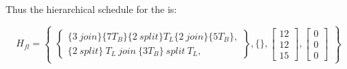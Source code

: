 Thus the hierarchical schedule for the {\feedbackloop} is:

\begin{displaymath}
H_{fl} = \left\{
\begin{array}{c}
\left\{\begin{array}{c}\{3\ join\} \{7T_B\} \{2\ split\} T_L \{2\ join\} \{5T_B\},\\
\{2\ split\}\ T_L \ join\ \{3T_B\}\ split\
T_L,\end{array}\right\}, \{\}, \left[
\begin{array}{c}
12\\12\\15
\end{array}\right], \left[
\begin{array}{c}
0\\0\\0
\end{array}\right] \end{array}\right\}
\end{displaymath}

\begin{comment}
Scheduling {\feedbackloops} requires some extra care, as explained
above.  Once again, steady schedule multiplicities are computed,
but this time, the amount of data buffered between the {\joiner},
$body$, {\splitter} and $loop$ is required in order to perform the
algorithm.

The first step in the algorithm is to execute the {\joiner} as many
times as possible, depending on how much data is available between
the $loop$ and the {\joiner}, up to the number permitted in
executing a steady schedule. Data is transferred between buffers
at known rates, and buffering is adjusted appropriately. Next the
$body$ is executed as much as possible, followed by the {\splitter},
followed by the $loop$.  If, after executing this sequence, the
{\joiner}, $body$, {\splitter} or $loop$ need to be executed more
times in order to complete a steady schedule, this execution is
repeated until the steady schedule is completed.

It is possible, that the algorithm above deadlocks - there is not
enough data for any of the children to advance.  This does not
necessarily mean that the {\feedbackloop} has no legal schedule.
This is because pseudo single-appearance scheduling is a coarse
scheduling technique.  Furthermore, this problem is not caused by
hierarchical scheduling.  Figure
\ref{fig:feedback-non-schedulable} contains an example of a
{\feedbackloop} that cannot be scheduled using any single appearance
technique.
\end{comment}
